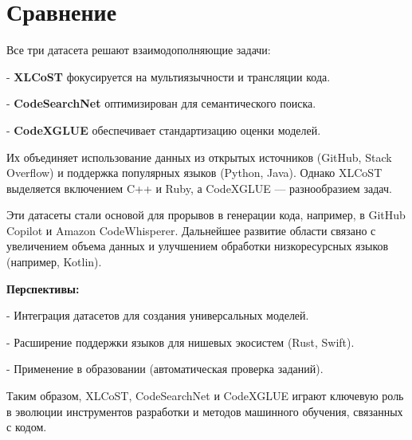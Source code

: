 \newpage

\section{Сравнение}
Все три датасета решают взаимодополняющие задачи:

    
- \textbf{XLCoST} фокусируется на мультиязычности и трансляции кода.
    
- \textbf{CodeSearchNet} оптимизирован для семантического поиска.
    
- \textbf{CodeXGLUE} обеспечивает стандартизацию оценки моделей.


Их объединяет использование данных из открытых источников (GitHub, Stack Overflow) и поддержка популярных языков (Python, Java). Однако XLCoST выделяется включением C++ и Ruby, а CodeXGLUE — разнообразием задач.

Эти датасеты стали основой для прорывов в генерации кода, например, в GitHub Copilot и Amazon CodeWhisperer. Дальнейшее развитие области связано с увеличением объема данных и улучшением обработки низкоресурсных языков (например, Kotlin).

\textbf{Перспективы:}

    
- Интеграция датасетов для создания универсальных моделей.
    
- Расширение поддержки языков для нишевых экосистем (Rust, Swift).
    
- Применение в образовании (автоматическая проверка заданий).


Таким образом, XLCoST, CodeSearchNet и CodeXGLUE играют ключевую роль в эволюции инструментов разработки и методов машинного обучения, связанных с кодом.


